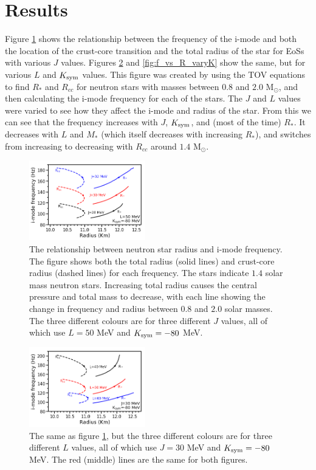 \documentclass[fleqn,usenatbib]{mnras}
\begin{document}
\section{Results}
\hspace{\parindent}Figure \ref{fig:f_vs_R_varyJ} shows the relationship between the frequency of the i-mode and both the location of the crust-core transition and the total radius of the star for EoSs with various $J$ values. Figures \ref{fig:f_vs_R_varyL} and \ref{fig:f_vs_R_varyK} show the same, but for various $L$ and $K_{\rm sym}$ values. This figure was created by using the TOV equations to find $R_*$ and $R_{cc}$ for neutron stars with masses between $0.8$ and $2.0$ M$_{\odot}$, and then calculating the i-mode frequency for each of the stars. The $J$ and $L$ values were varied to see how they affect the i-mode and radius of the star. From this we can see that the frequency increases with $J$, $K_{\rm sym}$, and (most of the time) $R_*$. It decreases with $L$ and $M_*$ (which itself decreases with increasing $R_*$), and switches from increasing to decreasing with $R_{cc}$ around $1.4$ M$_{\odot}$.

\begin{figure}
\centering
\includegraphics[width=0.45\textwidth,angle=0]{f_Rcc_Rstar_J_grid.png}
\caption{The relationship between neutron star radius and i-mode frequency. The figure shows both the total radius (solid lines) and crust-core radius (dashed lines) for each frequency. The stars indicate $1.4$ solar mass neutron stars. Increasing total radius causes the central pressure and total mass to decrease, with each line showing the change in frequency and radius between $0.8$ and $2.0$ solar masses. The three different colours are for three different $J$ values, all of which use $L=50$ MeV and $K_{\rm sym}=-80$ MeV.}
\label{fig:f_vs_R_varyJ}
\end{figure}

\begin{figure}
\centering
\includegraphics[width=0.45\textwidth,angle=0]{f_Rcc_Rstar_L_grid.png}
\caption{The same as figure \ref{fig:f_vs_R_varyJ}, but the three different colours are for three different $L$ values, all of which use $J=30$ MeV and $K_{\rm sym}=-80$ MeV. The red (middle) lines are the same for both figures.}
\label{fig:f_vs_R_varyL}
\end{figure}
\end{document}
